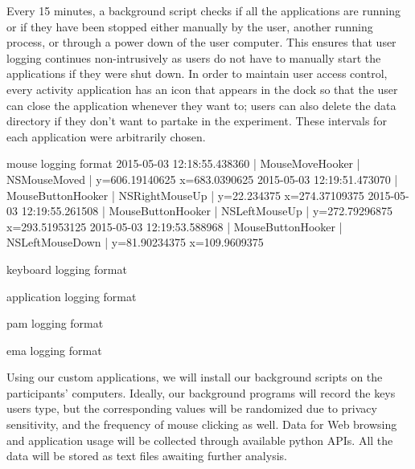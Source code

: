 \documentclass{article}
\begin{document}
Every 15 minutes, a background script checks if all the applications are running or if they have been stopped either manually by the user, another running process, or through a power down of the user computer. This ensures that user logging continues non-intrusively as users do not have to manually start the applications if they were shut down. In order to maintain user access control, every activity application has an icon that appears in the dock so that the user can close the application whenever they want to; users can also delete the data directory if they don't want to partake in the experiment. These intervals for each application were arbitrarily chosen. 

mouse logging format
2015-05-03 12:18:55.438360 |      MouseMoveHooker |           NSMouseMoved | y=606.19140625 x=683.0390625
2015-05-03 12:19:51.473070 |    MouseButtonHooker |         NSRightMouseUp | y=22.234375 x=274.37109375
2015-05-03 12:19:55.261508 |    MouseButtonHooker |          NSLeftMouseUp | y=272.79296875 x=293.51953125
2015-05-03 12:19:53.588968 |    MouseButtonHooker |        NSLeftMouseDown | y=81.90234375 x=109.9609375


keyboard logging format


application logging format


pam logging format

ema logging format

 
Using our custom applications, we will install our background scripts on the participants’ computers. Ideally, our background programs will record the keys users type, but the corresponding values will be randomized due to privacy sensitivity, and the frequency of mouse clicking as well.
Data for Web browsing and application usage will be collected through available python APIs. All the data will be stored as text files awaiting further analysis.
\end{document}
